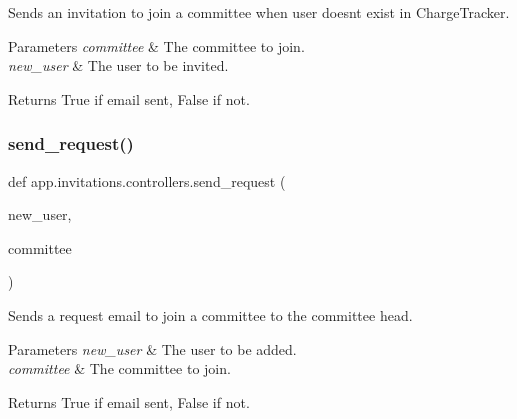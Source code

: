 Sends an invitation to join a committee when user doesn\textquotesingle{}t exist in Charge\+Tracker. 


\begin{DoxyParams}{Parameters}
{\em committee} & The committee to join. \\
\hline
{\em new\+\_\+user} & The user to be invited.\\
\hline
\end{DoxyParams}
\begin{DoxyReturn}{Returns}
True if email sent, False if not. 
\end{DoxyReturn}
\mbox{\label{namespaceapp_1_1invitations_1_1controllers_a41239d3a243861515a5a14599333ad0e}} 
\subsubsection{\texorpdfstring{send\+\_\+request()}{send\_request()}}
{\footnotesize\ttfamily def app.\+invitations.\+controllers.\+send\+\_\+request (\begin{DoxyParamCaption}\item[{}]{new\+\_\+user,  }\item[{}]{committee }\end{DoxyParamCaption})}



Sends a request email to join a committee to the committee head. 


\begin{DoxyParams}{Parameters}
{\em new\+\_\+user} & The user to be added. \\
\hline
{\em committee} & The committee to join.\\
\hline
\end{DoxyParams}
\begin{DoxyReturn}{Returns}
True if email sent, False if not. 
\end{DoxyReturn}
\mbox{\label{namespaceapp_1_1invitations_1_1controllers_a5bc2456a1f82dd8c9c0942dfdfbda935}} 
